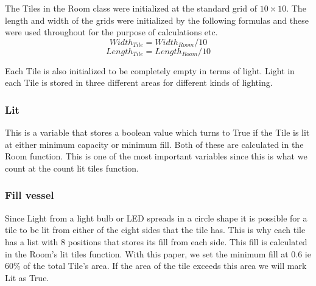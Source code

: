 \documentclass[conference]{IEEEtran}
\begin{document}

The Tiles in the Room class were initialized at the standard grid of $10 \times 10$. The
length and width of the grids were initialized by the following formulas and
these were used throughout for the purpose of calculations etc.
\begin{equation}
    Width_{Tile} = Width_{Room}/10
\end{equation}
\begin{equation}
    Length_{Tile} = Length_{Room}/10
\end{equation}

Each Tile is also initialized to be completely empty in terms of light. Light
in each Tile is stored in three different areas for different kinds of
lighting.\\

\subsubsection{Lit}
This is a variable that stores a boolean value which turns to True if the Tile is lit at either minimum capacity or minimum fill. Both of these are calculated in the Room function. This is one of the most important variables since this is what we count at the count lit tiles function. \\

\subsubsection{Fill vessel}
Since Light from a light bulb or LED spreads in a circle shape it is possible for a tile to be lit from either of the eight sides that the tile has. This is why each tile has a list with 8 positions that stores its fill from each side. This fill is calculated in the Room's lit tiles function. With this paper, we set the minimum fill at 0.6 ie 60\% of the total Tile's area. If the area of the tile exceeds this area we will mark Lit as True. 
\end{document}
